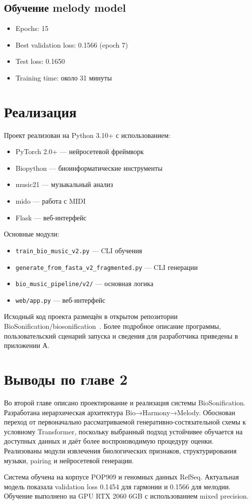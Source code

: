 \subsection{Обучение melody model}

\begin{itemize}
\item Epochs: 15
\item Best validation loss: 0.1566 (epoch 7)
\item Test loss: 0.1650
\item Training time: около 31 минуты
\end{itemize}

\section{Реализация}

Проект реализован на Python 3.10+ с использованием:
\begin{itemize}
\item PyTorch 2.0+ — нейросетевой фреймворк~\cite{pytorch}
\item Biopython — биоинформатические инструменты~\cite{cock2009}
\item music21 — музыкальный анализ~\cite{music21}
\item mido — работа с MIDI
\item Flask — веб-интерфейс
\end{itemize}

Основные модули:
\begin{itemize}
\item \texttt{train\_bio\_music\_v2.py} — CLI обучения
\item \texttt{generate\_from\_fasta\_v2\_fragmented.py} — CLI генерации
\item \texttt{bio\_music\_pipeline/v2/} — основная логика
\item \texttt{web/app.py} — веб-интерфейс
\end{itemize}

Исходный код проекта размещён в открытом репозитории BioSonification/biosonification~\cite{biosonification_repo}. Более подробное описание программы, пользовательский сценарий запуска и сведения для разработчика приведены в приложении А.

\section*{Выводы по главе 2}

Во второй главе описано проектирование и реализация системы BioSonification. Разработана иерархическая архитектура Bio→Harmony→Melody. Обоснован переход от первоначально рассматриваемой генеративно-состязательной схемы к условному Transformer, поскольку выбранный подход устойчивее обучается на доступных данных и даёт более воспроизводимую процедуру оценки. Реализованы модули извлечения биологических признаков, структурирования музыки, pairing и нейросетевой генерации.

Система обучена на корпусе POP909 и геномных данных RefSeq. Актуальная модель показала validation loss 0.1454 для гармонии и 0.1566 для мелодии. Обучение выполнено на GPU RTX 2060 6GB с использованием mixed precision.
